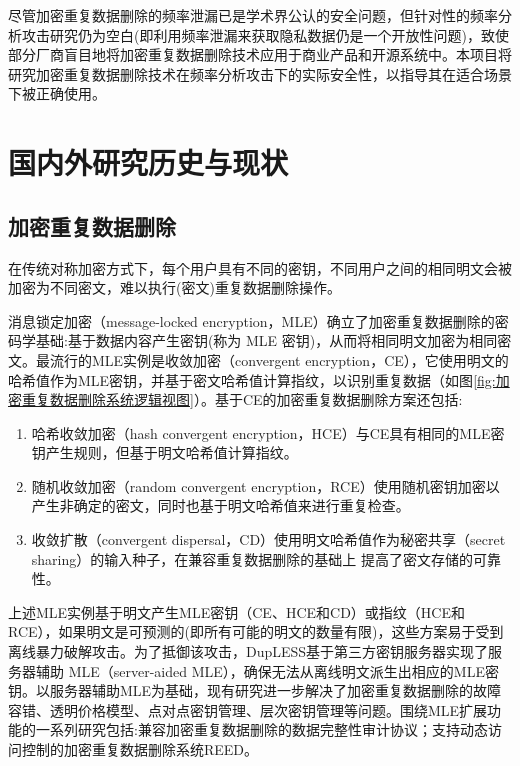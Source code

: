 尽管加密重复数据删除的频率泄漏已是学术界公认的安全问题，但针对性的频率分析攻击研究仍为空白(即利用频率泄漏来获取隐私数据仍是一个开放性问题)，致使部分厂商盲目地将加密重复数据删除技术应用于商业产品和开源系统中。本项目将研究加密重复数据删除技术在频率分析攻击下的实际安全性，以指导其在适合场景下被正确使用。


\section{国内外研究历史与现状}

\subsection{加密重复数据删除}
\label{sec:加密重复数据删除}
在传统对称加密方式下，每个用户具有不同的密钥，不同用户之间的相同明文会被加密为不同密文，难以执行(密文)重复数据删除操作。

消息锁定加密（message-locked encryption，MLE）确立了加密重复数据删除的密码学基础:基于数据内容产生密钥(称为 MLE 密钥)，从而将相同明文加密为相同密文。最流行的MLE实例是收敛加密（convergent encryption，CE），它使用明文的哈希值作为MLE密钥，并基于密文哈希值计算指纹，以识别重复数据（如图\ref{fig:加密重复数据删除系统逻辑视图}）。基于CE的加密重复数据删除方案还包括:

\begin{enumerate}
    \item 哈希收敛加密（hash convergent encryption，HCE）与CE具有相同的MLE密钥产生规则，但基于明文哈希值计算指纹。
    \item 随机收敛加密（random convergent encryption，RCE）使用随机密钥加密以产生非确定的密文，同时也基于明文哈希值来进行重复检查。
    \item 收敛扩散（convergent dispersal，CD）使用明文哈希值作为秘密共享（secret sharing）的输入种子，在兼容重复数据删除的基础上 提高了密文存储的可靠性。
\end{enumerate}

上述MLE实例基于明文产生MLE密钥（CE、HCE和CD）或指纹（HCE和RCE），如果明文是可预测的(即所有可能的明文的数量有限)，这些方案易于受到离线暴力破解攻击。为了抵御该攻击，DupLESS基于第三方密钥服务器实现了服务器辅助 MLE（server-aided MLE），确保无法从离线明文派生出相应的MLE密钥。以服务器辅助MLE为基础，现有研究进一步解决了加密重复数据删除的故障容错、透明价格模型、点对点密钥管理、层次密钥管理等问题。围绕MLE扩展功能的一系列研究包括:兼容加密重复数据删除的数据完整性审计协议；支持动态访问控制的加密重复数据删除系统REED。

